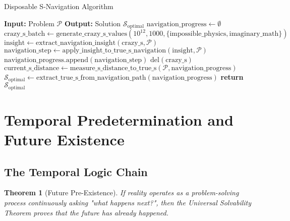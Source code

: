 \documentclass[12pt,a4paper]{article}
\newtheorem{theorem}{Theorem}[section]
\begin{document}
\begin{algorithm}
\caption{Disposable S-Navigation Algorithm}
\begin{algorithmic}
\STATE \textbf{Input:} Problem $\mathcal{P}$
\STATE \textbf{Output:} Solution $\mathcal{S}_{\text{optimal}}$
\STATE
\STATE $\text{navigation\_progress} \leftarrow \emptyset$
    \STATE $\text{crazy\_s\_batch} \leftarrow \text{generate\_crazy\_s\_values}(10^{12}, 1000, \{\text{impossible\_physics}, \text{imaginary\_math}\})$
            \STATE $\text{insight} \leftarrow \text{extract\_navigation\_insight}(\text{crazy\_s}, \mathcal{P})$
            \STATE $\text{navigation\_step} \leftarrow \text{apply\_insight\_to\_true\_s\_navigation}(\text{insight}, \mathcal{P})$
            \STATE $\text{navigation\_progress.append}(\text{navigation\_step})$
        \ENDIF
        \STATE $\text{del}(\text{crazy\_s})$ 
    \ENDFOR
    \STATE $\text{current\_s\_distance} \leftarrow \text{measure\_s\_distance\_to\_true\_s}(\mathcal{P}, \text{navigation\_progress})$
\ENDWHILE
\STATE $\mathcal{S}_{\text{optimal}} \leftarrow \text{extract\_true\_s\_from\_navigation\_path}(\text{navigation\_progress})$
\STATE \textbf{return} $\mathcal{S}_{\text{optimal}}$
\end{algorithmic}
\end{algorithm}

\section{Temporal Predetermination and Future Existence}

\subsection{The Temporal Logic Chain}

\begin{theorem}[Future Pre-Existence]
If reality operates as a problem-solving process continuously asking "what happens next?", then the Universal Solvability Theorem proves that the future has already happened.
\end{theorem}
\end{document}
